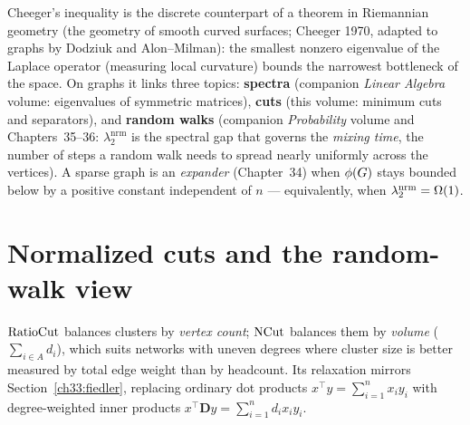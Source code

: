 \begin{connectionbox}
Cheeger's inequality is the discrete counterpart of a theorem in Riemannian geometry (the geometry of smooth curved surfaces; Cheeger 1970, adapted to graphs by Dodziuk and Alon--Milman): the smallest nonzero eigenvalue of the Laplace operator (measuring local curvature) bounds the narrowest bottleneck of the space. On graphs it links three topics: \textbf{spectra} (companion \emph{Linear Algebra} volume: eigenvalues of symmetric matrices), \textbf{cuts} (this volume: minimum cuts and separators), and \textbf{random walks} (companion \emph{Probability} volume and Chapters~35--36: $\lambda_2^{\mathrm{nrm}}$ is the spectral gap that governs the \emph{mixing time}, the number of steps a random walk needs to spread nearly uniformly across the vertices). A sparse graph is an \emph{expander} (Chapter~34) when $\phi(G)$ stays bounded below by a positive constant independent of $n$ --- equivalently, when $\lambda_2^{\mathrm{nrm}}=\Omega(1)$.
\end{connectionbox}

\section{Normalized cuts and the random-walk view}
\label{ch33:ncut}

$\operatorname{RatioCut}$ balances clusters by \emph{vertex count}; $\operatorname{NCut}$ balances them by \emph{volume} ($\sum_{i\in A} d_i$), which suits networks with uneven degrees where cluster size is better measured by total edge weight than by headcount. Its relaxation mirrors Section~\ref{ch33:fiedler}, replacing ordinary dot products $x^\top y = \sum_{i=1}^n x_i y_i$ with degree-weighted inner products $x^\top \mathbf{D} y = \sum_{i=1}^n d_i x_i y_i$.

